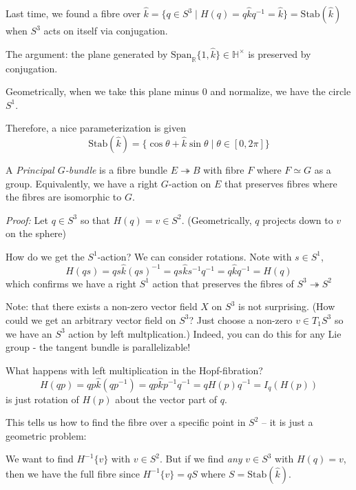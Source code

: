 \documentclass[12pt]{article}
\renewcommand{\hat}[1]{\widehat{#1}}
\newcommand{\R}{\mathbb{R}}
\renewcommand{\H}{\mathbb{H}}
\newcommand{\khat}{\hat{k}}
\newenvironment*{tbox}[2][gray]{
    \begin{tcolorbox}[
        parbox=false,
        colback=#1!5!white,
        colframe=#1!75!black,
        breakable,
        title={#2}
    ]}
    {\end{tcolorbox}}
\begin{document}
    Last time, we found a fibre over $\khat = \{q \in S^3 \; | \; H(q) = q\khat q^{-1} = \khat\} = \text{Stab}(\khat)$ when $S^3$ acts on itself via conjugation. 
    
    The argument: the plane generated by $\text{Span}_{\R}\{1, \khat\} \in \H^{\times}$ is preserved by conjugation. 

    Geometrically, when we take this plane minus $0$ and normalize, we have the circle $S^1$. 

    Therefore, a nice parameterization is given 
    \[\text{Stab}(\khat) = \{\cos \theta + \khat \sin \theta \; | \; \theta \in [0, 2\pi]\}\]

    A \emph{Principal $G$-bundle} is a fibre bundle $E \twoheadrightarrow B$ with fibre $F$ where $F \simeq G$ as a group. Equivalently, we have a right $G$-action on $E$ that preserves fibres where the fibres are isomorphic to $G$.

    \begin{tbox}{\textbf{Claim:} The Hopf fibration $H: S^3 \to S^2$ is a principal $S^1$-bundle over $S^2$}
        \emph{Proof:} Let $q \in S^3$ so that $H(q) = v \in S^2$. (Geometrically, $q$ projects down to $v$ on the sphere)

        How do we get the $S^1$-action? We can consider rotations. Note with $s \in S^1$,
        \[H(qs) = qs\khat (qs)^{-1} = qs\khat s^{-1}q^{-1} = q\khat q^{-1} = H(q)\] 
        which confirms we have a right $S^1$ action that preserves the fibres of $S^3 \twoheadrightarrow S^2$
    \end{tbox}

    Note: that there exists a non-zero vector field $X$ on $S^3$ is not surprising. (How could we get an arbitrary vector field on $S^3$? Just choose a non-zero $v \in T_1 S^{3}$ so we have an $S^3$ action by left multplication.) Indeed, you can do this for any Lie group - the tangent bundle is parallelizable! 

    What happens with left multiplication in the Hopf-fibration? 
    \[H(qp) = qp\khat (qp^{-1}) = qp\khat p^{-1}q^{-1} = qH(p)q^{-1} = I_q(H(p))\]
    is just rotation of $H(p)$ about the vector part of $q$. 

    This tells us how to find the fibre over a specific point in $S^2$ -- it is just a geometric problem:

    We want to find $H^{-1}\{v\}$ with $v \in S^2$. But if we find \emph{any} $v \in S^3$ with $H(q) = v$, then we have the full fibre since $H^{-1}\{v\} = qS$ where $S = \text{Stab}(\khat)$. 
\end{document}
